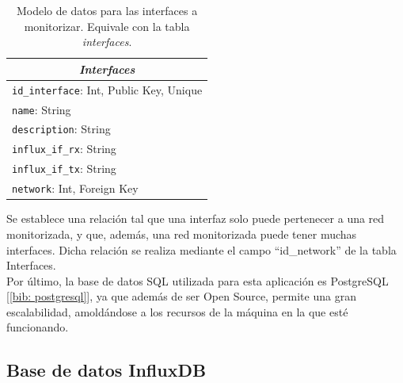 \documentclass[a4paper, oneside, 12pt]{book}
\begin{document}
	
	\begin{table}[h!]
		\centering
		\begin{tabular}{|l|}
			\hline
			\multicolumn{1}{|c|}{\textit{\textbf{Interfaces}}} \\ \hline
			\texttt{id\_interface}: Int, Public Key, Unique             \\ \hline
			\texttt{name}: String                                       \\ \hline
			\texttt{description}: String                                \\ \hline
			\texttt{influx\_if\_rx}: String                             \\ \hline
			\texttt{influx\_if\_tx}: String                             \\ \hline
			\texttt{network}: Int, Foreign Key                          \\ \hline
		\end{tabular}
		\caption{Modelo de datos para las interfaces a monitorizar. Equivale con la tabla \textit{interfaces}.}
		\label{tab: modelo sql interfaces}
	\end{table}
	
	\vspace{12px}
	
	\noindent Se establece una relación tal que una interfaz solo puede pertenecer a una red monitorizada, y que, además, una red monitorizada puede tener muchas interfaces. Dicha relación se realiza mediante el campo ``id\_network'' de la tabla Interfaces. \\
	
	\noindent Por último, la base de datos SQL utilizada para esta aplicación es PostgreSQL [\ref{bib: postgresql}], ya que además de ser Open Source, permite una gran escalabilidad, amoldándose a los recursos de la máquina en la que esté funcionando.
	
	\pagebreak
	
	\subsection{Base de datos InfluxDB}
	
\end{document}
